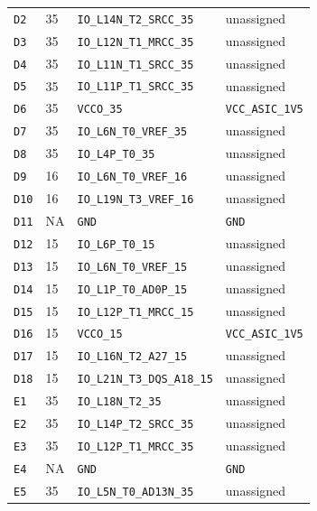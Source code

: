\documentclass[11pt,a4paper]{article}
\begin{document}
\begin{longtable}{@{}P{13mm}P{13mm}P{78mm}P{62mm}@{}}
\nolinkurl{D2} & 35 & \nolinkurl{IO_L14N_T2_SRCC_35} & \textcolor{muted}{unassigned} \\
\nolinkurl{D3} & 35 & \nolinkurl{IO_L12N_T1_MRCC_35} & \textcolor{muted}{unassigned} \\
\nolinkurl{D4} & 35 & \nolinkurl{IO_L11N_T1_SRCC_35} & \textcolor{muted}{unassigned} \\
\nolinkurl{D5} & 35 & \nolinkurl{IO_L11P_T1_SRCC_35} & \textcolor{muted}{unassigned} \\
\nolinkurl{D6} & 35 & \nolinkurl{VCCO_35} & \nolinkurl{VCC_ASIC_1V5} \\
\nolinkurl{D7} & 35 & \nolinkurl{IO_L6N_T0_VREF_35} & \textcolor{muted}{unassigned} \\
\nolinkurl{D8} & 35 & \nolinkurl{IO_L4P_T0_35} & \textcolor{muted}{unassigned} \\
\nolinkurl{D9} & 16 & \nolinkurl{IO_L6N_T0_VREF_16} & \textcolor{muted}{unassigned} \\
\nolinkurl{D10} & 16 & \nolinkurl{IO_L19N_T3_VREF_16} & \textcolor{muted}{unassigned} \\
\nolinkurl{D11} & NA & \nolinkurl{GND} & \nolinkurl{GND} \\
\nolinkurl{D12} & 15 & \nolinkurl{IO_L6P_T0_15} & \textcolor{muted}{unassigned} \\
\nolinkurl{D13} & 15 & \nolinkurl{IO_L6N_T0_VREF_15} & \textcolor{muted}{unassigned} \\
\nolinkurl{D14} & 15 & \nolinkurl{IO_L1P_T0_AD0P_15} & \textcolor{muted}{unassigned} \\
\nolinkurl{D15} & 15 & \nolinkurl{IO_L12P_T1_MRCC_15} & \textcolor{muted}{unassigned} \\
\nolinkurl{D16} & 15 & \nolinkurl{VCCO_15} & \nolinkurl{VCC_ASIC_1V5} \\
\nolinkurl{D17} & 15 & \nolinkurl{IO_L16N_T2_A27_15} & \textcolor{muted}{unassigned} \\
\nolinkurl{D18} & 15 & \nolinkurl{IO_L21N_T3_DQS_A18_15} & \textcolor{muted}{unassigned} \\
\nolinkurl{E1} & 35 & \nolinkurl{IO_L18N_T2_35} & \textcolor{muted}{unassigned} \\
\nolinkurl{E2} & 35 & \nolinkurl{IO_L14P_T2_SRCC_35} & \textcolor{muted}{unassigned} \\
\nolinkurl{E3} & 35 & \nolinkurl{IO_L12P_T1_MRCC_35} & \textcolor{muted}{unassigned} \\
\nolinkurl{E4} & NA & \nolinkurl{GND} & \nolinkurl{GND} \\
\nolinkurl{E5} & 35 & \nolinkurl{IO_L5N_T0_AD13N_35} & \textcolor{muted}{unassigned} \\

\end{longtable}
\end{document}
